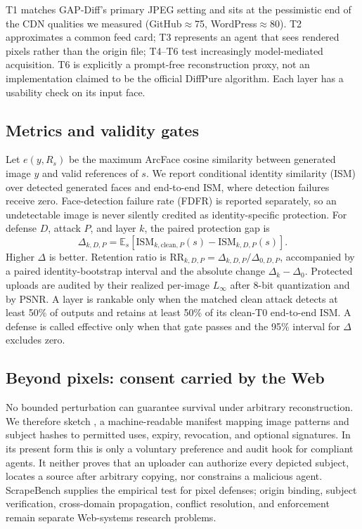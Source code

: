 T1 matches GAP-Diff's primary JPEG setting and sits at the pessimistic end of
the CDN qualities we measured (GitHub$\approx$75, WordPress$\approx$80). T2
approximates a common feed card; T3 represents an agent that sees rendered
pixels rather than the origin file; T4--T6 test increasingly model-mediated
acquisition. T6 is explicitly a
prompt-free reconstruction proxy, not an implementation claimed to be the
official DiffPure algorithm. Each layer has a usability check on its input face.

\subsection{Metrics and validity gates}
Let $e(y,R_s)$ be the maximum ArcFace cosine similarity between generated image
$y$ and valid references of $s$. We report conditional identity similarity
(ISM) over detected generated faces and end-to-end ISM, where detection failures
receive zero. Face-detection failure rate (FDFR) is reported separately, so an
undetectable image is never silently credited as identity-specific protection.
For defense $D$, attack $P$, and layer $k$, the paired protection gap is
\begin{equation}
\Delta_{k,D,P}=\mathbb{E}_s[\mathrm{ISM}_{k,\mathrm{clean},P}(s)-
\mathrm{ISM}_{k,D,P}(s)].
\end{equation}
Higher $\Delta$ is better. Retention ratio is
$\mathrm{RR}_{k,D,P}=\Delta_{k,D,P}/\Delta_{0,D,P}$, accompanied by a paired
identity-bootstrap interval and the absolute change $\Delta_k-\Delta_0$.
Protected uploads are audited by their realized per-image $L_\infty$ after
8-bit quantization and by PSNR. A layer is
rankable only when the matched clean attack detects at least 50\% of outputs
and retains at least 50\% of its clean-T0 end-to-end ISM. A defense is called
effective only when that gate passes and the 95\% interval for $\Delta$
excludes zero.

\subsection{Beyond pixels: consent carried by the Web}
No bounded perturbation can guarantee survival under arbitrary reconstruction.
We therefore sketch , a machine-readable
manifest mapping image patterns and subject hashes to permitted uses, expiry,
revocation, and optional signatures. In its present form this is only a
voluntary preference and audit hook for compliant agents. It neither proves
that an uploader can authorize every depicted subject, locates a source after
arbitrary copying, nor constrains a malicious agent. ScrapeBench supplies the
empirical test for pixel defenses; origin binding, subject verification,
cross-domain propagation, conflict resolution, and enforcement remain separate
Web-systems research problems.
